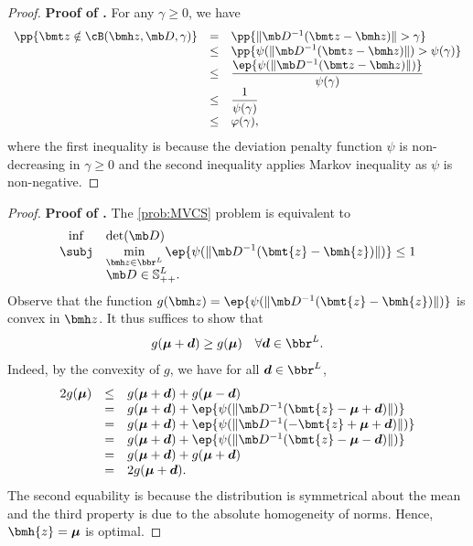 \documentclass[mnsc, nonblindrev]{informswp}
\newcommand{\1}[1]{\mathds{1}{\left(#1\right)}}
\begin{document}
\begin{appendices}
\begin{proof}{\bf Proof of .}
For any $\gamma \geq 0$, we have
\[
\begin{array}{rcl}
\pp{\bmt z \notin \cB(\bmh z, \mb D, \gamma)} & = & \pp{ \|\mb D^{-1} (\bmt z - \bmh z) \| >\gamma} \\
& \leq & \displaystyle \pp{\psi(\|\mb D^{-1} (\bmt z - \bmh z) \|) > \psi(\gamma)} \\
& \leq & \displaystyle \frac{\ep{\psi(\|\mb D^{-1} (\bmt z - \bmh z)\|)}}{\psi(\gamma)} \\
& \leq & \displaystyle \dfrac{1}{\psi(\gamma)} \\
& \leq & \varphi(\gamma),
\end{array}
\]
where the first inequality is because the deviation penalty function $\psi$ is non-decreasing in $\gamma \geq 0$ and the second inequality applies Markov inequality as $\psi$ is non-negative. 
\hfill \Halmos
\end{proof}
\vspace{3mm}

\begin{proof}{\bf Proof of .}
The \ref{prob:MVCS} problem is equivalent to
\begin{equation}
\label{prob:MVCSESpecialSym2}
\begin{array}{cll}
\inf & \displaystyle\det({\mb D}) \\
\subj & \displaystyle\displaystyle \min_{\bmh z  \in \bbr^L} \ep{ \psi(\|\mb D^{-1} ( \bmt{z} - \bmh{z} ) \| )} \leq 1 \\
& \displaystyle{\mb D} \in \mathbb{S}^L_{++}.
\end{array}  
\end{equation}
Observe that the function $g(\bmh z) = \ep{ \psi(\| \mb D^{-1} ( \bmt{z} - \bmh{z} ) \|)}$
is convex in $\bmh z$. It thus suffices to show that 
$$
g(\bm \mu + \bm d) \geq g(\bm \mu) ~~~\forall \bm d \in \bbr^L. 
$$
Indeed, by the convexity of $g$, we have for all $\bm d \in \bbr^L$, 
$$
\begin{array}{rcl}
2g(\bm \mu) & \leq & g(\bm \mu + \bm d) +g(\bm \mu - \bm d) \\
&=& g(\bm \mu + \bm d)  + \ep{\psi(\|\mb D^{-1}(\bmt{z} - \bm{\mu} + \bm d)\|)} \\
&=& g(\bm \mu + \bm d) + \ep{\psi(\|\mb D^{-1}(-\bmt{z} + \bm{\mu} + \bm d)\|)} \\
&=& g(\bm \mu + \bm d) + \ep{\psi(\|\mb D^{-1}(\bmt{z} - \bm{\mu} - \bm d)\|)} \\
&=& g(\bm \mu + \bm d) + g(\bm \mu + \bm d) \\
&=& 2g(\bm \mu + \bm d). 
\end{array}
$$
The second equability is because the distribution is symmetrical about the mean and the third property is due to the absolute homogeneity of norms. Hence, $\bmh{z} = \bm{\mu}$ is optimal.
\hfill \Halmos
\end{proof}
\vspace{3mm}


\end{appendices}
\end{document}
